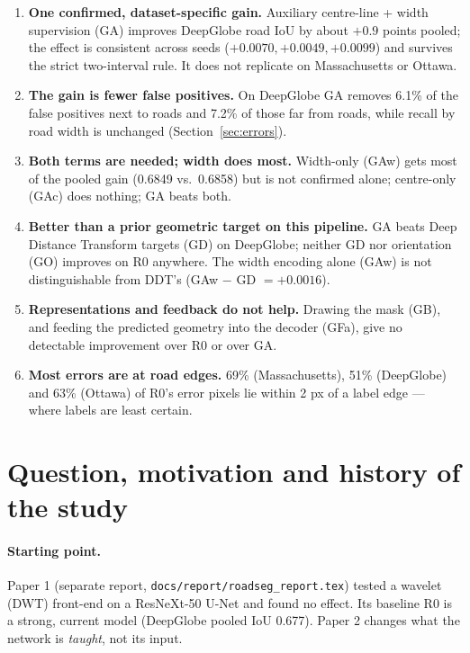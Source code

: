 \documentclass[11pt]{article}
\begin{document}
\begin{enumerate}
  \item \textbf{One confirmed, dataset-specific gain.} Auxiliary centre-line + width supervision (GA)
        improves DeepGlobe road IoU by about $+0.9$ points pooled; the effect is consistent across
        seeds ($+0.0070, +0.0049, +0.0099$) and survives the strict two-interval rule. It does not
        replicate on Massachusetts or Ottawa.
  \item \textbf{The gain is fewer false positives.} On DeepGlobe GA removes 6.1\% of the false
        positives next to roads and 7.2\% of those far from roads, while recall by road width is
        unchanged (Section~\ref{sec:errors}).
  \item \textbf{Both terms are needed; width does most.} Width-only (GAw) gets most of the pooled gain
        (0.6849 vs.\ 0.6858) but is not confirmed alone; centre-only (GAc) does nothing; GA beats both.
  \item \textbf{Better than a prior geometric target on this pipeline.} GA beats Deep Distance
        Transform targets (GD) on DeepGlobe; neither GD nor orientation (GO) improves on R0 anywhere.
        The width encoding alone (GAw) is not distinguishable from DDT's (GAw $-$ GD $=+0.0016$).
  \item \textbf{Representations and feedback do not help.} Drawing the mask (GB), and feeding the
        predicted geometry into the decoder (GFa), give no detectable improvement over R0 or over GA.
  \item \textbf{Most errors are at road edges.} 69\% (Massachusetts), 51\% (DeepGlobe) and 63\%
        (Ottawa) of R0's error pixels lie within 2 px of a label edge --- where labels are least
        certain.
\end{enumerate}

\section{Question, motivation and history of the study}
\label{sec:history}

\paragraph{Starting point.} Paper 1 (separate report, \texttt{docs/report/roadseg\_report.tex})
tested a wavelet (DWT) front-end on a ResNeXt-50 U-Net and found no effect. Its baseline R0 is a
strong, current model (DeepGlobe pooled IoU 0.677). Paper 2 changes what the network is
\emph{taught}, not its input.
\end{document}
